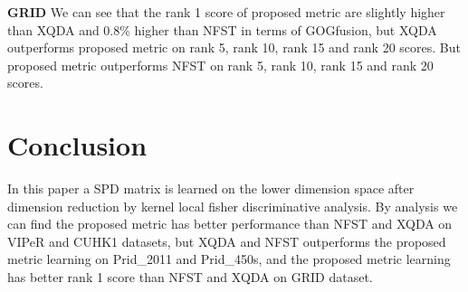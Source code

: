 \documentclass[conference,compsoc]{IEEEtran}
\begin{document}
\textbf{GRID} We can see that the rank 1 score of proposed metric are slightly higher than XQDA and 0.8\% higher than NFST in terms of GOGfusion, but XQDA outperforms proposed metric on rank 5, rank 10, rank 15 and rank 20 scores. But proposed metric outperforms NFST on rank 5, rank 10, rank 15 and rank 20 scores.

\section{Conclusion}
In this paper a SPD matrix is learned on the lower dimension space after dimension reduction by kernel local fisher discriminative analysis. By analysis we can find the proposed metric has better performance than NFST and XQDA on VIPeR and CUHK1 datasets, but XQDA and NFST outperforms the proposed metric learning on Prid\_2011 and Prid\_450s, and the proposed metric learning has better rank 1 score than NFST and XQDA on GRID dataset. 


%
%
%






%
%
%



\end{document}
